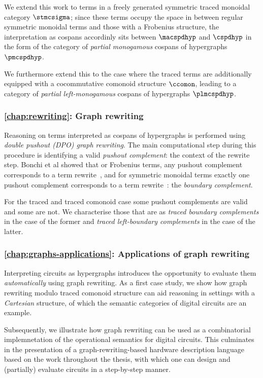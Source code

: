 We extend this work to terms in a freely generated symmetric traced monoidal
category \(\stmcsigma\); since these terms occupy the space in between regular
symmetric monoidal terms and those with a Frobenius structure, the interpretation as
cospans accordinly sits between \(\macspdhyp\) and \(\cspdhyp\) in the form of
the category of \emph{partial monogamous} cospans of hypergraphs \(\pmcspdhyp\).

We furthermore extend this to the case where the traced terms are additionally
equipped with a cocommutative comonoid structure \(\ccomon\), leading to a
category of \emph{partial left-monogamous} cospans of hypergraphs
\(\plmcspdhyp\).

\subsubsection{\cref{chap:rewriting}: Graph rewriting}

Reasoning on terms interpreted as cospans of hypergraphs is performed using
\emph{double pushout (DPO) graph rewriting}.
The main computational step during this procedure is identifying a valid
\emph{pushout complement}: the context of the rewrite step.
Bonchi et al showed that or Frobenius terms, any pushout complement corresponds
to a term rewrite~\cite{bonchi2022string}, and for symmetric monoidal terms
exactly one pushout complement corresponds to a term
rewrite~\cite{bonchi2022stringa}: the \emph{boundary complement}.

For the traced and traced comonoid case some pushout complements are valid and
some are not.
We characterise those that are as \emph{traced boundary complements} in the case
of the former and \emph{traced left-boundary complements} in the case of the
latter.

\subsubsection{\cref{chap:graphs-applications}: Applications of graph rewriting}

Interpreting circuits as hypergraphs introduces the opportunity to evaluate them
\emph{automatically} using graph rewriting.
As a first case study, we show how graph rewriting modulo traced comonoid
structure can aid reasoning in settings with a \emph{Cartesian} structure, of
which the semantic categories of digital circuits are an example.

Subsequently, we illustrate how graph rewriting can be used as a combinatorial
implemnetation of the operational semantics for digital circuits.
This culminates in the presentation of a graph-rewriting-based hardware
description language based on the work throughout the thesis, with which one can
design and (partially) evaluate circuits in a step-by-step manner.